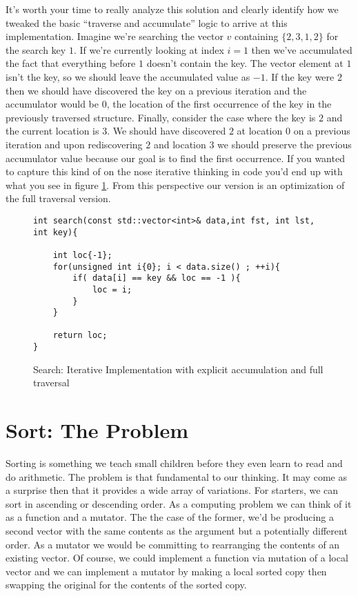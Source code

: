 \documentclass[]{tufte-handout}
\begin{document}
It's worth your time to really analyze this solution and clearly identify how we tweaked the basic ``traverse and accumulate'' logic to arrive at this implementation. Imagine we're searching the vector $v$ containing $\{2,3,1,2\}$ for the search key $1$. If we're currently looking at index $i=1$ then we've accumulated the fact that everything before $1$ doesn't contain the key. The vector element at $1$ isn't the key, so we should leave the accumulated value as $-1$. If the key were $2$ then we should have discovered the key on a previous iteration and the accumulator would be $0$, the location of the first occurrence of the key in the previously traversed structure. Finally, consider the case where the key is $2$ and the current location is $3$. We should have discovered $2$ at location $0$ on a previous iteration and upon rediscovering $2$ and location $3$ we should preserve the previous accumulator value because our goal is to find the first occurrence. If you wanted to capture this kind of on the nose iterative thinking in code you'd end up with what you see in figure \ref{code:searchiter2}. From this perspective our version is an optimization of the full traversal version.

\begin{figure}[htpb!]
\begin{lstlisting}
int search(const std::vector<int>& data,int fst, int lst, int key){

	int loc{-1};
    for(unsigned int i{0}; i < data.size() ; ++i){
    	if( data[i] == key && loc == -1 ){
			loc = i;
		}
    }

    return loc;
}
\end{lstlisting}
\label{code:searchiter2}
\caption{Search: Iterative Implementation with explicit accumulation and full traversal}
\end{figure}

\section{Sort: The Problem}

Sorting is something we teach small children before they even learn to read and do arithmetic. The problem is that fundamental to our thinking. It may come as a surprise then that it provides a wide array of variations.  For starters, we can sort in ascending or descending order. As a computing problem we can think of it as a function and a mutator. The the case of the former, we'd be producing a second vector with the same contents as the argument but a potentially different order. As a mutator we would be committing to rearranging the contents of an existing vector. Of course, we could implement a function via mutation of a local vector and we can implement a mutator by making a local sorted copy then swapping the original for the contents of the sorted copy.
\end{document}
